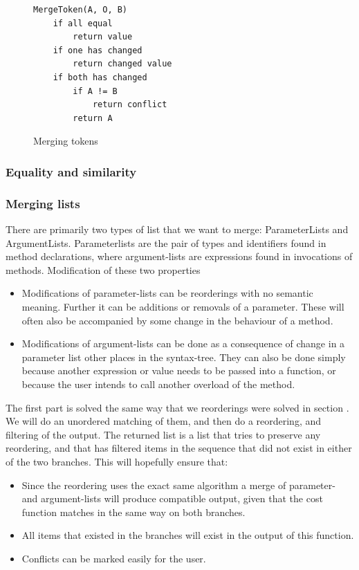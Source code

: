 \documentclass[11pt]{article}
\begin{document}
\begin{figure}
  \caption{Merging tokens}
  \label{MergeToken}
\begin{verbatim}
MergeToken(A, O, B)
    if all equal
        return value
    if one has changed
        return changed value
    if both has changed 
        if A != B
            return conflict
        return A
\end{verbatim}
\end{figure}


\subsubsection{Equality and similarity}
\label{FunctionSimilarity}

\subsubsection{Merging lists}
There are primarily two types of list that we want to merge: ParameterLists and ArgumentLists. Parameterlists are the pair of types and identifiers found in method declarations, where argument-lists are expressions found in invocations of methods. Modification of these two properties 

\begin{itemize}
   \item Modifications of parameter-lists can be reorderings with no semantic meaning. Further it can be additions or removals of a parameter. These will often also be accompanied by some change in the behaviour of a method.
   \item Modifications of argument-lists can be done as a consequence of change in a parameter list other places in the syntax-tree. They can also be done simply because another expression or value needs to be passed into a function, or because the user intends to call another overload of the method.
\end{itemize}

The first part is solved the same way that we reorderings were solved in section . We will do an unordered matching of them, and then do a reordering, and filtering of the output. The returned list is a list that tries to preserve any reordering, and that has filtered items in the sequence that did not exist in either of the two branches. This will hopefully ensure that:

\begin{itemize}
   \item Since the reordering uses the exact same algorithm a merge of parameter- and argument-lists will produce compatible output, given that the cost function matches in the same way on both branches.
   \item All items that existed in the branches will exist in the output of this function. 
   \item Conflicts can be marked easily for the user.
\end{itemize}
\end{document}
